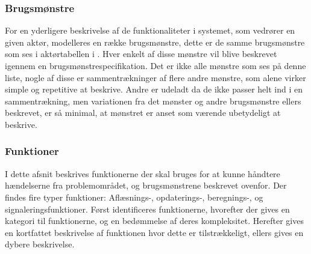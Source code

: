 \subsubsection*{Brugsmønstre}
For en yderligere beskrivelse af de funktionaliteter i systemet, som vedrører en given aktør, modelleres en række brugsmønstre, dette er de samme brugsmønstre som ses i aktørtabellen i . 
Hver enkelt af disse mønstre vil blive beskrevet igennem en brugsmønstrespecifikation. 
Det er ikke alle mønstre som ses på denne liste, nogle af disse er sammentrækninger af flere andre mønstre, som alene virker simple og repetitive at beskrive. 
Andre er udeladt da de ikke passer helt ind i en sammentrækning, men variationen fra det mønster og andre brugsmønstre ellers beskrevet, er så minimal, at mønstret er anset som værende ubetydeligt at beskrive.



\subsubsection{Funktioner}

I dette afsnit beskrives funktionerne der skal bruges for at kunne håndtere hændelserne fra problemområdet, og brugsmønstrene beskrevet ovenfor. 
Der findes fire typer funktioner: Aflæsnings-, opdaterings-, beregnings-, og signaleringsfunktioner.\citep{OOA&D2001}
Først identificeres funktionerne, hvorefter der gives en kategori til funktionerne, og en bedømmelse af deres kompleksitet. Herefter gives en kortfattet beskrivelse af funktionen hvor dette er tilstrækkeligt, ellers gives en dybere beskrivelse.

